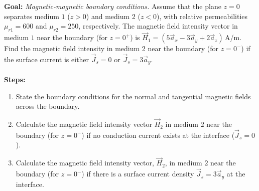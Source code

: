 \documentclass[../../header.tex]{subfiles}
\begin{document}
\textbf{Goal:} \textit{Magnetic-magnetic boundary conditions.} Assume that the plane $z=0$ separates medium $1$ ($z > 0$) and medium 2 ($z < 0$), with relative permeabilities $\mu_{r1} = 600$ and $\mu_{r2} = 250$, respectively. The magnetic field intensity vector in medium $1$ near the boundary (for $z = 0^+$) is $\vec{H}_1 = (5\vec{a}_x - 3\vec{a}_y + 2\vec{a}_z)$\,A/m. Find the magnetic field intensity in medium 2 near the boundary (for $z = 0^-$) if the surface current is either $\vec{J}_s = 0$ or $\vec{J}_s = 3 \vec{a}_y$.\\
\\
\textbf{Steps:} 
\begin{enumerate}
\item State the boundary conditions for the normal and tangential magnetic fields across the boundary.\\

\item Calculate the magnetic field intensity vector $\vec{H}_2$ in medium $2$ near the boundary (for $z = 0^-$) if no conduction current exists at the interface ($\vec{J}_s = 0$).\\

\item Calculate the magnetic field intensity vector, $\vec{H}_2$, in medium $2$ near the boundary (for $z = 0^-$) if there is a surface current density $\vec{J}_s = 3 \vec{a}_y$ at the interface.\\

\end{enumerate}
\end{document}
